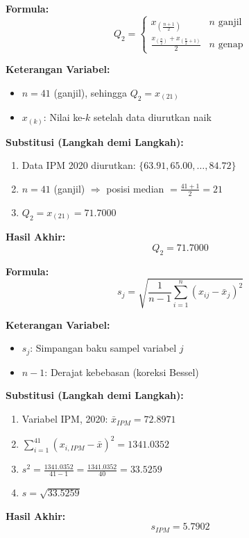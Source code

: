 \documentclass[11pt,a4paper]{article}
\begin{document}
\begin{tcolorbox}[formula_box, title={3. Median (Kuartil Kedua, $Q_2$)}]
\textbf{Formula:}
\[ Q_2 = \begin{cases} x_{\left(\frac{n+1}{2}\right)} & n \text{ ganjil} \\ \frac{x_{\left(\frac{n}{2}\right)} + x_{\left(\frac{n}{2}+1\right)}}{2} & n \text{ genap} \end{cases} \]

\textbf{Keterangan Variabel:}
\begin{itemize}
  \item $n = 41$ (ganjil), sehingga $Q_2 = x_{(21)}$
  \item $x_{(k)}$: Nilai ke-$k$ setelah data diurutkan naik
\end{itemize}

\textbf{Substitusi (Langkah demi Langkah):}
\begin{enumerate}
  \item Data IPM 2020 diurutkan: $\{63.91, 65.00, \ldots, 84.72\}$
  \item $n = 41$ (ganjil) $\Rightarrow$ posisi median $= \frac{41+1}{2} = 21$
  \item $Q_2 = x_{(21)} = 71.7000$
\end{enumerate}

\textbf{Hasil Akhir:}
\[ Q_2 = 71.7000 \]
\end{tcolorbox}

\begin{tcolorbox}[formula_box, title={4. Simpangan Baku ($s$)}]
\textbf{Formula:}
\[ s_j = \sqrt{\frac{1}{n-1} \sum_{i=1}^{n} (x_{ij} - \bar{x}_j)^2} \]

\textbf{Keterangan Variabel:}
\begin{itemize}
  \item $s_j$: Simpangan baku sampel variabel $j$
  \item $n-1$: Derajat kebebasan (koreksi Bessel)
\end{itemize}

\textbf{Substitusi (Langkah demi Langkah):}
\begin{enumerate}
  \item Variabel IPM, 2020: $\bar{x}_{IPM} = 72.8971$
  \item $\sum_{i=1}^{41} (x_{i,IPM} - \bar{x})^2 = 1341.0352$
  \item $s^2 = \frac{1341.0352}{41-1} = \frac{1341.0352}{40} = 33.5259$
  \item $s = \sqrt{33.5259}$
\end{enumerate}

\textbf{Hasil Akhir:}
\[ s_{IPM} = 5.7902 \]
\end{tcolorbox}
\end{document}
